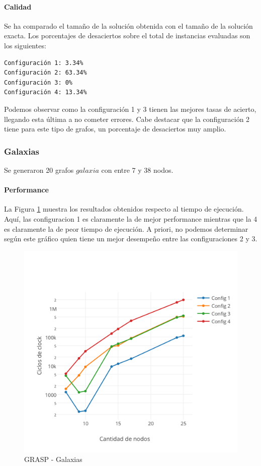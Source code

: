 \paragraph{Calidad} Se ha comparado el tamaño de la solución obtenida con el tamaño de la solución exacta. Los porcentajes de desaciertos sobre el total de instancias evaluadas son los siguientes:

\begin{verbatim}
Configuración 1: 3.34%
Configuración 2: 63.34%
Configuración 3: 0%
Configuración 4: 13.34%
\end{verbatim}

Podemos observar como la configuración 1 y 3 tienen las mejores tasas de acierto, llegando esta última a no cometer errores. Cabe destacar que la configuración 2 tiene para este tipo de grafos, un porcentaje de desaciertos muy amplio.

\subsubsection{Galaxias}

Se generaron 20 grafos $galaxia$ con entre 7 y 38 nodos.

\paragraph{Performance}

La Figura \ref{fig:4C} muestra los resultados obtenidos respecto al tiempo de ejecución. Aquí, las configuracion 1 es claramente la de mejor performance mientras que la 4 es claramente la de peor tiempo de ejecución. A priori, no podemos determinar según este gráfico quien tiene un mejor desempeño entre las configuraciones 2 y 3. 

\begin{figure}[htb]
	\begin{center}
    		\includegraphics[scale=0.8]{imagenes/grasp-galaxias-tiempos.png}
	\end{center}
	\caption{GRASP - Galaxias}\label{fig:4C}
\end{figure}


